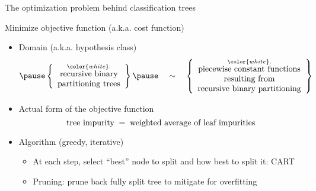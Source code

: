 

\begin{frame}{\vskip -0.2cm \large The optimization problem behind classification trees}

\Large
\begin{center}
\pause
Minimize objective function (a.k.a. cost function)
\end{center}

\large
\begin{itemize}
\item
	\pause
	Domain (a.k.a. hypothesis class)
	\vskip -0.1cm
	{\scriptsize\begin{equation*}
	\pause
	\left\{\begin{array}{c}
		\overset{{\color{white}.}}{\textnormal{recursive binary}} \\
		\textnormal{partitioning trees}
	\end{array}\right\}
	\pause
	\quad\sim\quad
	\left\{\begin{array}{c}
		\overset{{\color{white}.}}{\textnormal{piecewise constant functions}} \\
		\textnormal{resulting from} \\
		\textnormal{recursive binary partitioning}
	\end{array}\right\}
	\end{equation*}}

\item
	\pause
	Actual form of the objective function
	\pause
	\vskip -0.1cm
	{\footnotesize\begin{equation*}
	\textnormal{tree impurity}
	\;=\;
		\textnormal{weighted average of leaf impurities}
	\end{equation*}}

\item
	\pause
	Algorithm (greedy, iterative)
	\begin{itemize}
	\item
		\pause
		{\footnotesize At each step, select ``best'' node to split and how best to split it: CART}
	\item
		\pause
		{\footnotesize Pruning: prune back fully split tree to mitigate for overfitting}
	\end{itemize}
\end{itemize}

\end{frame}
\normalsize


